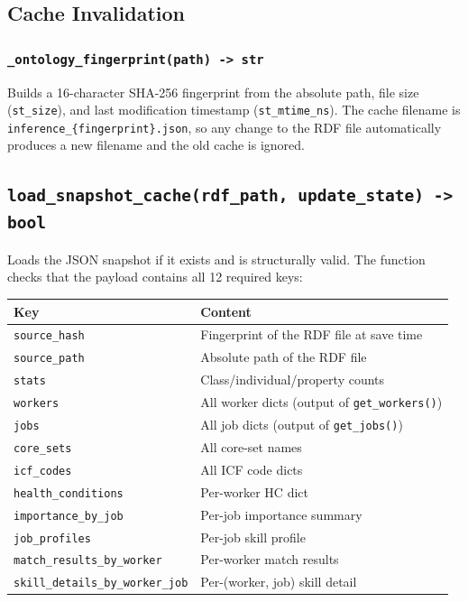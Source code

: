 ﻿\documentclass[12pt,a4paper]{article}
\begin{document}
\subsection{Cache Invalidation}

\subsubsection*{\texttt{\_ontology\_fingerprint(path) -> str}}

Builds a 16-character SHA-256 fingerprint from the absolute path, file size (\texttt{st\_size}), and last modification timestamp (\texttt{st\_mtime\_ns}). The cache filename is \texttt{inference\_\{fingerprint\}.json}, so any change to the RDF file automatically produces a new filename and the old cache is ignored.

\subsection{\texttt{load\_snapshot\_cache(rdf\_path, update\_state) -> bool}}

Loads the JSON snapshot if it exists and is structurally valid. The function checks that the payload contains all 12 required keys:

\begin{longtable}{@{}P{5cm}P{9.5cm}@{}}
\toprule
\textbf{Key} & \textbf{Content} \\
\midrule
\endhead
\texttt{source\_hash} & Fingerprint of the RDF file at save time \\
\texttt{source\_path} & Absolute path of the RDF file \\
\texttt{stats} & Class/individual/property counts \\
\texttt{workers} & All worker dicts (output of \texttt{get\_workers()}) \\
\texttt{jobs} & All job dicts (output of \texttt{get\_jobs()}) \\
\texttt{core\_sets} & All core-set names \\
\texttt{icf\_codes} & All ICF code dicts \\
\texttt{health\_conditions} & Per-worker HC dict \\
\texttt{importance\_by\_job} & Per-job importance summary \\
\texttt{job\_profiles} & Per-job skill profile \\
\texttt{match\_results\_by\_worker} & Per-worker match results \\
\texttt{skill\_details\_by\_worker\_job} & Per-(worker, job) skill detail \\
\bottomrule
\end{longtable}
\end{document}
